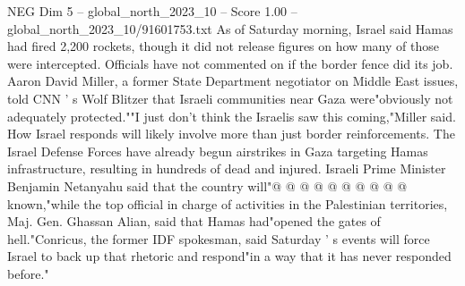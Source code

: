 \begin{textsample}{NEG Dim 5 – global\_north\_2023\_10 – Score 1.00 – global\_north\_2023\_10/91601753.txt}
As of Saturday morning, Israel said Hamas had fired 2,200 rockets, though it did not release figures on how many of those were intercepted.
Officials have not commented on if the border fence did its job.
Aaron David Miller, a former State Department negotiator on Middle East issues, told CNN ' s Wolf Blitzer that Israeli communities near Gaza were"obviously not adequately protected.""I just don't think the Israelis saw this coming,"Miller said.
How Israel responds will likely involve more than just border reinforcements.
The Israel Defense Forces have already begun airstrikes in Gaza targeting Hamas infrastructure, resulting in hundreds of dead and injured.
Israeli Prime Minister Benjamin Netanyahu said that the country will"@ @ @ @ @ @ @ @ @ @ known,"while the top official in charge of activities in the Palestinian territories, Maj.
Gen.
Ghassan Alian, said that Hamas had"opened the gates of hell."Conricus, the former IDF spokesman, said Saturday ' s events will force Israel to back up that rhetoric and respond"in a way that it has never responded before."

\end{textsample}
